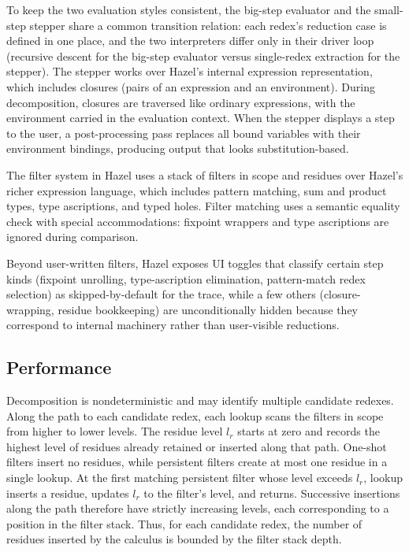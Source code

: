To keep the two evaluation styles consistent, the big-step evaluator
and the small-step stepper share a common transition relation: each
redex's reduction case is defined in one place, and the two
interpreters differ only in their driver loop (recursive
descent for the big-step evaluator versus single-redex extraction
for the stepper). The stepper works over Hazel's internal expression
representation, which includes closures (pairs of an expression and
an environment). During decomposition, closures are traversed like
ordinary expressions, with the environment carried in the evaluation
context. When the stepper displays a step to the user, a
post-processing pass replaces all bound variables with their
environment bindings, producing output that looks substitution-based.

The filter system in Hazel uses a stack of filters in scope and residues
over Hazel's richer expression language, which includes
pattern matching, sum and product types, type ascriptions, and typed
holes. Filter matching uses a semantic equality check with special
accommodations: fixpoint wrappers and type ascriptions are ignored
during comparison.

Beyond user-written filters, Hazel exposes UI toggles that classify
certain step kinds (fixpoint unrolling, type-ascription elimination,
pattern-match redex selection) as skipped-by-default for the trace,
while a few others (closure-wrapping, residue bookkeeping) are
unconditionally hidden because they correspond to internal machinery
rather than user-visible reductions.

\subsection{Performance}\label{sec:impl-perf}

Decomposition is nondeterministic and may identify multiple candidate
redexes. Along the path to each candidate redex, each lookup scans the
filters in scope from higher to lower levels. The residue level \(l_r\)
starts at zero and records the highest level of residues already retained
or inserted along that path. One-shot filters insert no residues, while
persistent filters create at most one residue in a single lookup. At the
first matching persistent filter whose level exceeds \(l_r\), lookup
inserts a residue, updates \(l_r\) to the filter's level, and returns.
Successive insertions along the path therefore have strictly increasing
levels, each corresponding to a position in the filter stack. Thus, for
each candidate redex, the number of residues inserted by the calculus is
bounded by the filter stack depth.


